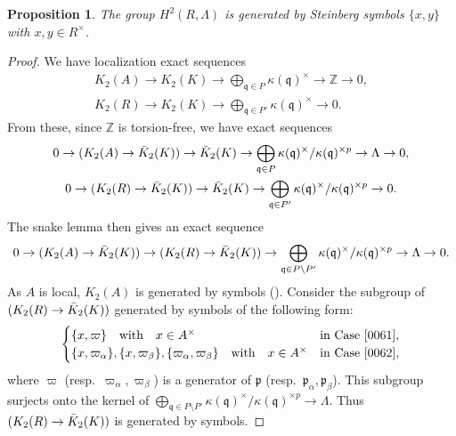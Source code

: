 \documentclass{amsart}
\newtheorem{Prop}[Thm]{Proposition}
\theoremstyle{remark}
\numberwithin{equation}{subsection}
\newcommand{\Z}{\mathbb{Z}}
\newcommand{\ideal}[1]{\mathfrak{#1}}
\let\Im\relax
\DeclareMathOperator{\Im}{Im}
\begin{document}
\begin{Prop} \label{0066}
	The group $H^{2}(R, \Lambda)$ is generated by
	Steinberg symbols $\{x, y\}$ with $x, y \in R^{\times}$.
\end{Prop}

\begin{proof}
	We have localization exact sequences
		\begin{gather*}
					K_{2}(A)
				\to
					K_{2}(K)
				\to
					\bigoplus_{\ideal{q} \in P}
						\kappa(\ideal{q})^{\times}
				\to
					\Z
				\to
					0,
			\\
					K_{2}(R)
				\to
					K_{2}(K)
				\to
					\bigoplus_{\ideal{q} \in P'}
						\kappa(\ideal{q})^{\times}
				\to
					0.
		\end{gather*}
	From these, since $\Z$ is torsion-free, we have exact sequences
		\begin{gather*}
					0
				\to
					\Im(K_{2}(A) \to \Bar{K}_{2}(K))
				\to
					\Bar{K}_{2}(K)
				\to
					\bigoplus_{\ideal{q} \in P}
						\kappa(\ideal{q})^{\times} / \kappa(\ideal{q})^{\times p}
				\to
					\Lambda
				\to
					0,
			\\
					0
				\to
					\Im(K_{2}(R) \to \Bar{K}_{2}(K))
				\to
					\Bar{K}_{2}(K)
				\to
					\bigoplus_{\ideal{q} \in P'}
						\kappa(\ideal{q})^{\times} / \kappa(\ideal{q})^{\times p}
				\to
					0.
		\end{gather*}
	The snake lemma then gives an exact sequence
		\[
				0
			\to
				\Im(K_{2}(A) \to \Bar{K}_{2}(K))
			\to
				\Im(K_{2}(R) \to \Bar{K}_{2}(K))
			\to
				\bigoplus_{\ideal{q} \in P \setminus P'}
					\kappa(\ideal{q})^{\times} / \kappa(\ideal{q})^{\times p}
			\to
				\Lambda
			\to
				0.
		\]
	As $A$ is local, $K_{2}(A)$ is generated by symbols (\cite[Chapter III, Theorem 5.10.5]{Wei13}).
	Consider the subgroup of $\Im(K_{2}(R) \to \Bar{K}_{2}(K))$ generated by
	symbols of the following form:
		\[
			\begin{cases}
						\{x, \varpi\}
					\quad \text{with} \quad x \in A^{\times}
				&	\text{in Case \eqref{0061}},
				\\
						 \{x, \varpi_{\alpha}\},
						 \{x, \varpi_{\beta}\},
						 \{\varpi_{\alpha}, \varpi_{\beta}\}
					\quad \text{with} \quad x \in A^{\times}
				&	\text{in Case \eqref{0062}},
			\end{cases}
		\]
	where $\varpi$ (resp.\ $\varpi_{\alpha}, \varpi_{\beta}$) is a generator of $\ideal{p}$
	(resp.\ $\ideal{p}_{\alpha}, \ideal{p}_{\beta}$).
	This subgroup surjects onto the kernel of
		$
				\bigoplus_{\ideal{q} \in P \setminus P'}
					\kappa(\ideal{q})^{\times} / \kappa(\ideal{q})^{\times p}
			\to
				\Lambda
		$.
	Thus $\Im(K_{2}(R) \to \Bar{K}_{2}(K))$ is generated by symbols.
\end{proof}
\end{document}
